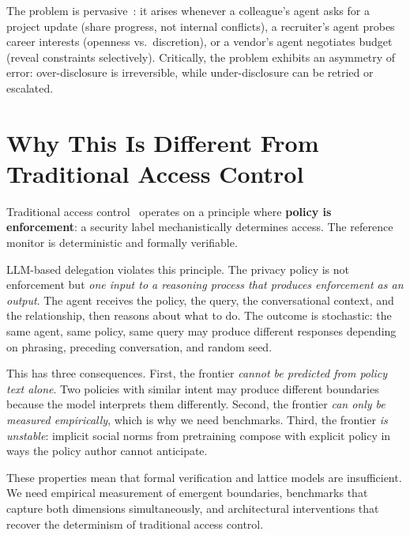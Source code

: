The problem is pervasive~\cite{talebirad2023multiagent, guo2024largelanguagemodelbased}: it arises whenever a colleague's agent asks for a project update (share progress, not internal conflicts), a recruiter's agent probes career interests (openness vs.\ discretion), or a vendor's agent negotiates budget (reveal constraints selectively). Critically, the problem exhibits an asymmetry of error: over-disclosure is irreversible, while under-disclosure can be retried or escalated.


\section{Why This Is Different From Traditional Access Control}
\label{sec:intro_different}

Traditional access control~\cite{bell1973secure, denning1976lattice} operates on a principle where \textbf{policy is enforcement}: a security label mechanistically determines access. The reference monitor is deterministic and formally verifiable.

LLM-based delegation violates this principle. The privacy policy is not enforcement but \textit{one input to a reasoning process that produces enforcement as an output}. The agent receives the policy, the query, the conversational context, and the relationship, then reasons about what to do. The outcome is stochastic: the same agent, same policy, same query may produce different responses depending on phrasing, preceding conversation, and random seed.

This has three consequences. First, the frontier \textit{cannot be predicted from policy text alone}. Two policies with similar intent may produce different boundaries because the model interprets them differently. Second, the frontier \textit{can only be measured empirically}, which is why we need benchmarks. Third, the frontier \textit{is unstable}: implicit social norms from pretraining compose with explicit policy in ways the policy author cannot anticipate.

These properties mean that formal verification and lattice models are insufficient. We need empirical measurement of emergent boundaries, benchmarks that capture both dimensions simultaneously, and architectural interventions that recover the determinism of traditional access control.


